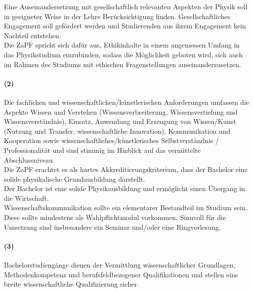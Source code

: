 \documentclass[a4paper]{scrartcl}
\begin{document}
\textcolor{Bernd}{\textbf{\cite{RESO: WiSe2012-ZivEng}}
Eine Auseinandersetzung mit gesellschaftlich relevanten As\-pek\-ten der Physik soll in geeigneter Weise in der Lehre Berücksichtigung finden. Gesellschaftliches Engagement soll gefördert werden und Studierenden aus ihrem Engagement kein Nachteil entstehen.}\\


\textcolor{Bernd}{\textbf{\cite{POS: WiSe2016-Ethik}} Die ZaPF spricht sich dafür aus, Ethikinhalte in einem angemessen Umfang in das Physikstudium einzubinden, sodass die Möglichkeit geboten wird, sich auch im Rahmen des Studiums mit ethischen Fragenstellungen auseinanderzusetzen.}

\paragraph{(2)} Die fachlichen und wissenschaftlichen/künstlerischen Anforderungen umfassen die Aspekte Wissen und Verstehen (Wissensverbreiterung, Wissensvertiefung und Wissensverständnis), Einsatz, Anwendung und Erzeugung von Wissen/Kunst (Nutzung und Transfer, wissenschaftliche Innovation), Kommunikation und Kooperation sowie wissenschaftliches/künstlerisches Selbstverständnis / Professionalität und sind stimmig im Hinblick auf das vermittelte Abschlussniveau.\\

\textcolor{Bernd}{\textbf{\cite{RESO: SoSe2002-RL}} Die ZaPF erachtet es als hartes Akkreditierungskriterium, dass der Bachelor eine solide physikalische Grundausbildung darstellt.}\\

\textcolor{Bernd}{\textbf{\cite{PROT: SoSe2018-Akk}} Der Bachelor ist eine solide Physikausbildung und ermöglicht einen Übergang in die Wirtschaft.} %
\\

\textcolor{Bernd}{\textbf{\cite{POS: WiSe2018-WiKom}} Wissenschaftskommunikation sollte ein ele\-men\-tarer Bestand\-teil im Studium sein. Diese sollte mindestens als Wahlpflichtmodul vorkommen. Sinnvoll für die Umsetzung sind insbesondere ein Seminar und/oder eine Ringvorlesung.}\\


\paragraph{(3)} Bachelorstudiengänge dienen der Vermittlung wissenschaftlicher Grundlagen, Methodenkompetenz und berufsfeldbezogener Qualifikationen und stellen eine breite wissenschaftliche Qualifizierung sicher.\\
\end{document}
